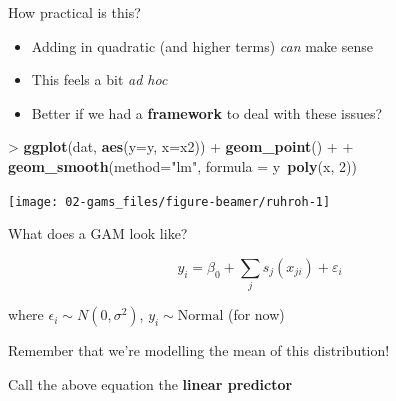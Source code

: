 \documentclass[10pt,ignorenonframetext,compress, aspectratio=169]{beamer}
\newenvironment{Shaded}{\begin{snugshade}}{\end{snugshade}}
\newcommand{\KeywordTok}[1]{\textcolor[rgb]{0.13,0.29,0.53}{\textbf{{#1}}}}
\newcommand{\DataTypeTok}[1]{\textcolor[rgb]{0.13,0.29,0.53}{{#1}}}
\newcommand{\DecValTok}[1]{\textcolor[rgb]{0.00,0.00,0.81}{{#1}}}
\newcommand{\StringTok}[1]{\textcolor[rgb]{0.31,0.60,0.02}{{#1}}}
\newcommand{\NormalTok}[1]{{#1}}
\providecommand{\tightlist}{%
  \setlength{\itemsep}{0pt}\setlength{\parskip}{0pt}}
\begin{document}
\begin{frame}[fragile]{How practical is this?}

\begin{itemize}
\tightlist
\item
  Adding in quadratic (and higher terms) \emph{can} make sense
\item
  This feels a bit \emph{ad hoc}
\item
  Better if we had a \textbf{framework} to deal with these issues?
\end{itemize}

\begin{Shaded}
\begin{Highlighting}[]
\NormalTok{>}\StringTok{ }\KeywordTok{ggplot}\NormalTok{(dat, }\KeywordTok{aes}\NormalTok{(}\DataTypeTok{y=}\NormalTok{y, }\DataTypeTok{x=}\NormalTok{x2)) +}\StringTok{ }\KeywordTok{geom_point}\NormalTok{() +}
\NormalTok{+}\StringTok{     }\KeywordTok{geom_smooth}\NormalTok{(}\DataTypeTok{method=}\StringTok{"lm"}\NormalTok{, }\DataTypeTok{formula =} \NormalTok{y~}\KeywordTok{poly}\NormalTok{(x, }\DecValTok{2}\NormalTok{))}
\end{Highlighting}
\end{Shaded}

\begin{center}\texttt{[image: 02-gams\_files/figure-beamer/ruhroh-1]} \end{center}

\end{frame}

\begin{frame}{What does a GAM look like?}

\[
y_i = \beta_0 + \sum_j s_j(x_{ji}) + \varepsilon_i
\]

where \(\epsilon_i \sim N(0, \sigma^2)\), \(y_i \sim \text{Normal}\)
(for now)

Remember that we're modelling the mean of this distribution!

Call the above equation the \textbf{linear predictor}

\end{frame}
\end{document}
